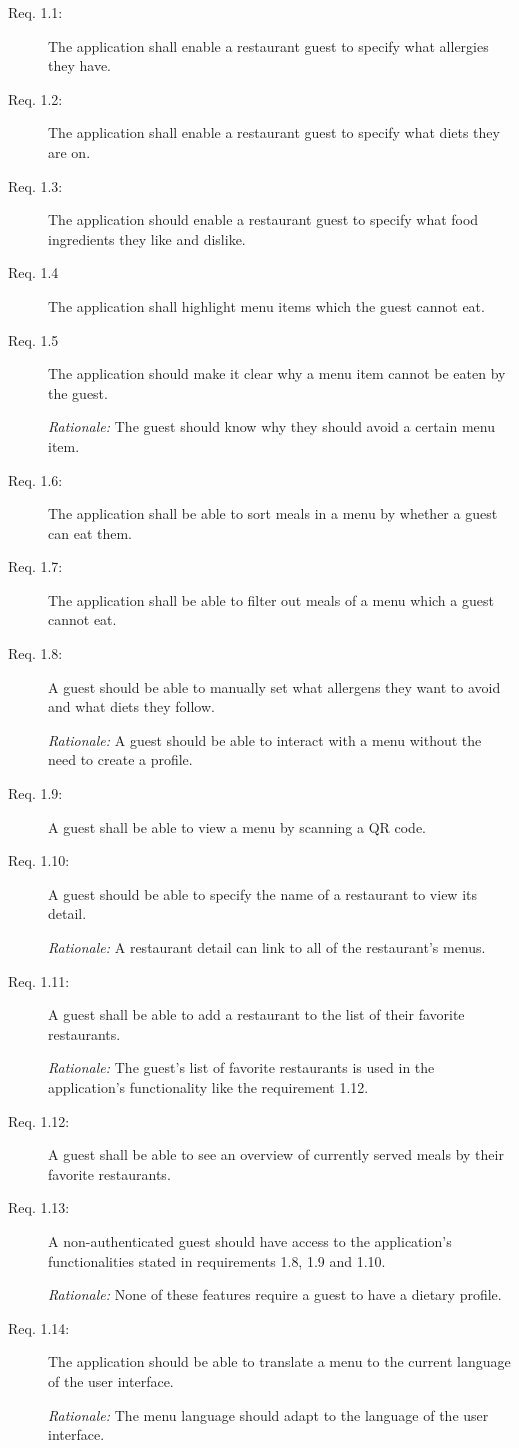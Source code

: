 \begin{description}
    \item [Req. 1.1:] The application shall enable a restaurant guest to specify what allergies they have.
    \item [Req. 1.2:] The application shall enable a restaurant guest to specify what diets they are on.
    \item [Req. 1.3:] The application should enable a restaurant guest to specify what food ingredients they like and dislike.
    \item [Req. 1.4] The application shall highlight menu items which the guest cannot eat.
    \item [Req. 1.5] The application should make it clear why a menu item cannot be eaten by the guest.

    \emph{Rationale:} The guest should know why they should avoid a certain menu item.
    \item [Req. 1.6:] The application shall be able to sort meals in a menu by whether a guest can eat them.
    \item [Req. 1.7:] The application shall be able to filter out meals of a menu which a guest cannot eat.
    \item [Req. 1.8:] A guest should be able to manually set what allergens they want to avoid and what diets they follow.

    \emph{Rationale:} A guest should be able to interact with a menu without the need to create a profile.
    \item [Req. 1.9:] A guest shall be able to view a menu by scanning a QR code.
    \item [Req. 1.10:] A guest should be able to specify the name of a restaurant to view its detail.

    \emph{Rationale:} A restaurant detail can link to all of the restaurant's menus. 
    \item [Req. 1.11:] A guest shall be able to add a restaurant to the list of their favorite restaurants.
    
    \emph{Rationale:} The guest's list of favorite restaurants is used in the application's functionality like the requirement 1.12.
    \item [Req. 1.12:] A guest shall be able to see an overview of currently served meals by their favorite restaurants.
    \item [Req. 1.13:] A non-authenticated guest should have access to the application's functionalities stated in requirements 1.8, 1.9 and 1.10. 
    
    \emph{Rationale:} None of these features require a guest to have a dietary profile.
    \item [Req. 1.14:] The application should be able to translate a menu to the current language of the user interface.

    \emph{Rationale:} The menu language should adapt to the language of the user interface.
\end{description}

